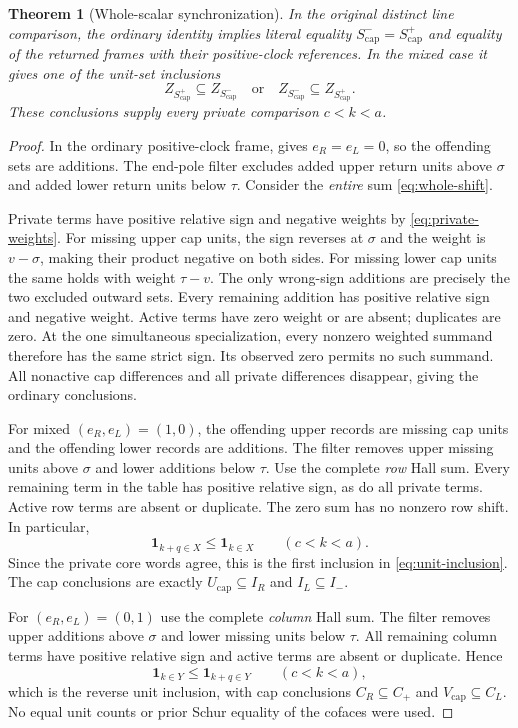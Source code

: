 \documentclass[11pt,a4paper]{amsart}
\numberwithin{equation}{section}
\theoremstyle{plain}
\newtheorem{theorem}{Theorem}[section]
\theoremstyle{definition}
\newcommand{\one}{\mathbf1}
\newcommand{\sminus}{S^{-}_{\mathrm{cap}}}
\newcommand{\splus}{S^{+}_{\mathrm{cap}}}
\begin{document}
\begin{theorem}[Whole-scalar synchronization]\label{thm:scalar-synchronization}
In the original distinct line comparison, the ordinary identity implies
literal equality \(\sminus=\splus\) and equality of the returned frames
with their positive-clock references.  In the mixed case it gives one of
the unit-set inclusions
\begin{equation}\label{eq:unit-inclusion}
 Z_{\splus}\subseteq Z_{\sminus}\quad\text{or}\quad
 Z_{\sminus}\subseteq Z_{\splus}.
\end{equation}
These conclusions supply every private comparison \(c<k<a\).
\end{theorem}
\begin{proof}
In the ordinary positive-clock frame,  gives
\(e_R=e_L=0\), so the offending sets are additions.  The end-pole filter
excludes added upper return units above \(\sigma\) and added lower return
units below \(\tau\).  Consider the \emph{entire} sum
\eqref{eq:whole-shift}.

Private terms have positive relative sign and negative weights by
\eqref{eq:private-weights}.  For missing upper cap units, the sign reverses
at \(\sigma\) and the weight is \(v-\sigma\), making their product negative
on both sides.  For missing lower cap units the same holds with weight
\(\tau-v\).  The only wrong-sign additions are precisely the two excluded
outward sets.  Every remaining addition has positive relative sign and
negative weight.  Active terms have zero weight or are absent; duplicates
are zero.  At the one simultaneous specialization, every nonzero weighted
summand therefore has the same strict sign.  Its observed zero permits no
such summand.  All nonactive cap differences and all private differences
disappear, giving the ordinary conclusions.

For mixed \((e_R,e_L)=(1,0)\), the offending upper records are missing cap
units and the offending lower records are additions.  The filter removes
upper missing units above \(\sigma\) and lower additions below \(\tau\).
Use the complete \emph{row} Hall sum.  Every remaining term in the table
has positive relative sign, as do all private terms.  Active row terms are
absent or duplicate.  The zero sum has no nonzero row shift.  In particular,
\[
 \one_{k+q\in X}\le\one_{k\in X}\qquad(c<k<a).
\]
Since the private core words agree, this is the first inclusion in
\eqref{eq:unit-inclusion}.  The cap conclusions are exactly
\(U_{\mathrm{cap}}\subseteq I_R\) and \(I_L\subseteq I_-\).

For \((e_R,e_L)=(0,1)\) use the complete \emph{column} Hall sum.
The filter removes upper additions above \(\sigma\) and lower missing
units below \(\tau\).  All remaining column terms have positive relative
sign and active terms are absent or duplicate.  Hence
\[
 \one_{k\in Y}\le\one_{k+q\in Y}\qquad(c<k<a),
\]
which is the reverse unit inclusion, with cap conclusions
\(C_R\subseteq C_+\) and \(V_{\mathrm{cap}}\subseteq C_L\).  No equal unit counts or
prior Schur equality of the cofaces were used.
\end{proof}
\end{document}
